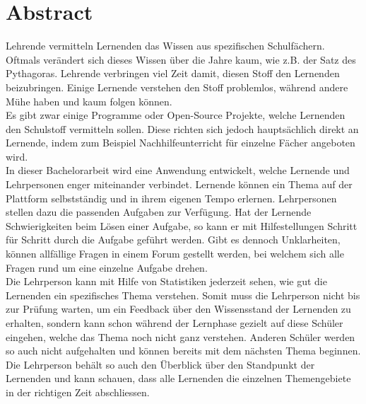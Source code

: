 \afterpage{\blankpage}
\section*{Abstract}

Lehrende vermitteln Lernenden das Wissen aus spezifischen Schulfächern. Oftmals verändert sich dieses Wissen über die Jahre kaum, wie z.B. der Satz des Pythagoras. Lehrende verbringen viel Zeit damit, diesen Stoff den Lernenden beizubringen. Einige Lernende verstehen den Stoff problemlos, während andere Mühe haben und kaum folgen können. \\

Es gibt zwar einige Programme oder Open-Source Projekte, welche Lernenden den Schulstoff vermitteln sollen. Diese richten sich jedoch hauptsächlich direkt an Lernende, indem zum Beispiel Nachhilfeunterricht für einzelne Fächer angeboten wird.\\

In dieser Bachelorarbeit wird eine Anwendung entwickelt, welche Lernende und Lehrpersonen enger miteinander verbindet. Lernende können ein Thema auf der Plattform selbstständig und in ihrem eigenen Tempo erlernen. Lehrpersonen stellen dazu die passenden Aufgaben zur Verfügung. Hat der Lernende Schwierigkeiten beim Lösen einer Aufgabe, so kann er mit Hilfestellungen Schritt für Schritt durch die Aufgabe geführt werden. Gibt es dennoch Unklarheiten, können allfällige Fragen in einem Forum gestellt werden, bei welchem sich alle Fragen rund um eine einzelne Aufgabe drehen. \\

Die Lehrperson kann mit Hilfe von Statistiken jederzeit sehen, wie gut die Lernenden ein spezifisches Thema verstehen. Somit muss die Lehrperson nicht bis zur Prüfung warten, um ein Feedback über den Wissensstand der Lernenden zu erhalten, sondern kann schon während der Lernphase gezielt auf diese Schüler eingehen, welche das Thema noch nicht ganz verstehen. Anderen Schüler werden so auch nicht aufgehalten und können bereits mit dem nächsten Thema beginnen. Die Lehrperson behält so auch den Überblick über den Standpunkt der Lernenden und kann schauen, dass alle Lernenden die einzelnen Themengebiete in der richtigen Zeit abschliessen.


\newpage